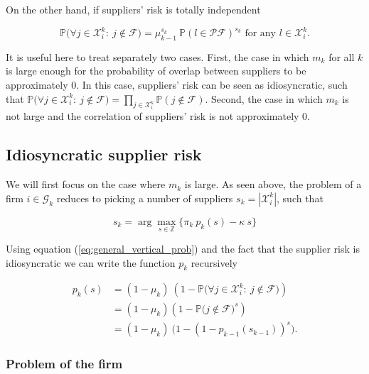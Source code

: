 \documentclass[american, abstract=on]{scrartcl}
\newcommand{\F}{\mathcal{F}}
\newcommand{\X}{\mathcal{X}}
\newcommand{\G}{\mathcal{G}}
\newcommand{\PF}{\mathcal{P} \F}
\renewcommand{\P}{\mathbb{P}}
\newcommand{\abs}[1]{\left\lvert#1\right\rvert}
\begin{document}
On the other hand, if suppliers' risk is totally independent

\begin{equation}
  \P\Big(\forall j \in \X^k_i: \ j \notin \F \Big) = \mu^{s_k}_{k-1} \ \P(l \in \PF)^{s_k}\text{ for any } l \in \X^k_i.
\end{equation}

It is useful here to treat separately two cases. First, the case in which $m_k$ for all $k$ is large enough for the probability of overlap between suppliers to be approximately 0. In this case, suppliers' risk can be seen as idiosyncratic, such that $\P\Big(\forall j \in \X^k_i: \ j \notin \F \Big) = \prod_{j \in \X^k_i} \P(j \notin \F)$. Second, the case in which $m_k$ is not large and the correlation of suppliers' risk is not approximately 0.

\subsection{Idiosyncratic supplier risk} \label{sec:vertical:ignoring}

We will first focus on the case where $m_k$ is large. As seen above, the problem of a firm $i \in \G_k$ reduces to picking a number of suppliers $s_k = \abs{\X^k_i}$, such that  

\begin{equation}
  s_k = \arg\max_{s \in \mathbb{Z}}\{ \pi_k \ p_k(s) - \kappa \ s \}
\end{equation}

Using equation (\ref{eq:general_vertical_prob}) and the fact that the supplier risk is idiosyncratic we can write the function $p_k$ recursively 

\begin{equation} \label{eq:recursive_idyo}
  \begin{split}
    p_k(s) &= (1 - \mu_k) \ \left(1 - \P\Big(\forall j \in \X^k_i: \ j \notin \F \Big)\right) \\
    &= (1 - \mu_k) \left(1 - \P\Big(j \notin \F \Big)^{s}\right) \\
    &= (1 - \mu_k) \ \Big(1 - (1 - p_{k-1}(s_{k-1}))^s \Big).
  \end{split}
\end{equation}


\subsubsection{Problem of the firm}
\end{document}
